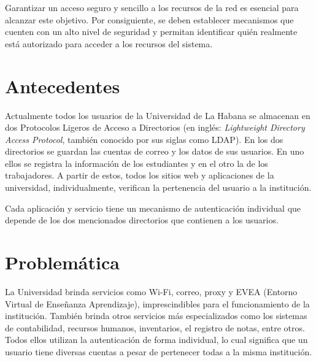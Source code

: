 
Garantizar un acceso seguro y sencillo a los recursos de la red es esencial para alcanzar este objetivo. Por consiguiente, se deben establecer mecanismos que cuenten con un alto nivel de seguridad y permitan identificar quién realmente está autorizado para acceder a los recursos del sistema.




\section*{Antecedentes}

Actualmente todos los usuarios de la Universidad de La Habana se almacenan en dos Protocolos Ligeros de Acceso a Directorios (en inglés: \textit{Lightweight Directory Access Protocol}, también conocido por sus siglas como LDAP). En los dos directorios se guardan las cuentas de correo y los datos de sus usuarios. En uno ellos se registra la información de los estudiantes y en el otro la de los trabajadores. A partir de estos, todos los sitios web y aplicaciones de la universidad, individualmente, verifican la pertenencia del usuario a la institución.

Cada aplicación y servicio tiene un mecanismo de autenticación individual que depende de los dos mencionados directorios que contienen a los usuarios.

\section*{Problemática}
La Universidad brinda servicios como Wi-Fi, correo, proxy y EVEA (Entorno Virtual de Enseñanza Aprendizaje), imprescindibles para el funcionamiento de la institución. También brinda otros servicios más especializados como los sistemas de contabilidad, recursos humanos, inventarios, el registro de notas, entre otros. Todos ellos utilizan la autenticación de forma individual, lo cual significa que un usuario tiene diversas cuentas a pesar de pertenecer todas a la misma institución.

